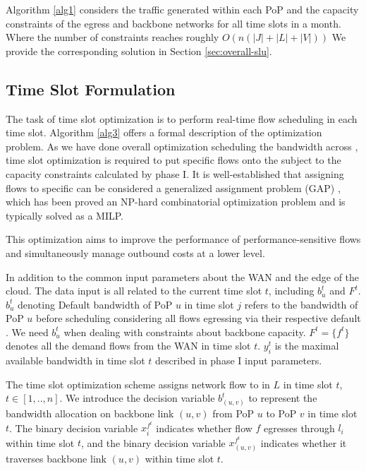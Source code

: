  \label{sec:overall-complexity}
Algorithm \ref{alg1} considers the traffic generated within each PoP and the capacity constraints of the egress and backbone networks for all time slots in a month. Where the number of constraints reaches roughly $O(n(|J|+|L|+|V|))$
We provide the corresponding solution in Section \ref{sec:overall-slu}.

\subsection{Time Slot Formulation}  \label{sec:timeslot-opt}

The task of time slot optimization is to perform real-time flow scheduling in each time slot. Algorithm \ref{alg3} offers a formal description of the optimization problem. As we have done overall optimization scheduling the bandwidth across {\egresses}, time slot optimization is required to put specific flows onto the {\egresses} subject to the capacity constraints calculated by phase I. It is well-established that assigning flows to specific {\egresses} can be considered a generalized assignment problem (GAP) \cite{shmoys1993approximationGAP}, which has been proved an NP-hard combinatorial optimization problem and is typically solved as a MILP.

This optimization aims to improve the performance of performance-sensitive flows and simultaneously manage outbound costs at a lower level. 

{In addition to the common input parameters about the WAN and the edge of the cloud. The data input is all related to the current time slot $t$, including $b^t_{u}$ and $F^t$. $b^t_{u}$ denoting Default bandwidth of PoP $u$ in time slot $j$ refers to the bandwidth of PoP $u$ before scheduling considering all flows egressing via their respective default {\egress}. We need $b^t_{u}$ when dealing with constraints about backbone capacity. $F^t=\{f^t\}$ denotes all the demand flows from the WAN in time slot $t$. $y^t_i$ is the maximal available bandwidth in time slot $t$ described in phase I input parameters.}


 The time slot optimization scheme assigns network flow to {\egresses} in $L$ in time slot $t$, $t\in[1,..,n]$. We introduce the decision variable $b^t_{(u,v)}$ to represent the bandwidth allocation on backbone link $(u,v)$ from PoP $u$ to PoP $v$ in time slot $t$. The binary decision variable $x_i^{f^{t}}$ indicates whether flow $f$ egresses through {\egress} $l_i$ within time slot $t$, and the binary decision variable $x_{(u,v)}^{f^{t}}$ indicates whether it traverses backbone link $(u,v)$ within time slot $t$.




